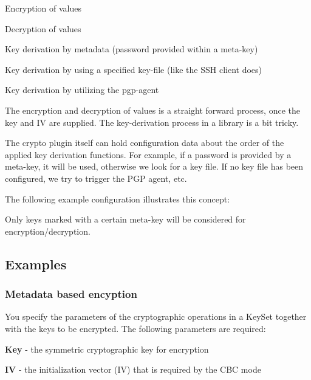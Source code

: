 \begin{DoxyItemize}
\item Encryption of values
\item Decryption of values
\item Key derivation by metadata (password provided within a meta-\/key)
\item Key derivation by using a specified key-\/file (like the S\+S\+H client does)
\item Key derivation by utilizing the pgp-\/agent
\end{DoxyItemize}

The encryption and decryption of values is a straight forward process, once the key and I\+V are supplied. The key-\/derivation process in a library is a bit tricky.

The crypto plugin itself can hold configuration data about the order of the applied key derivation functions. For example, if a password is provided by a meta-\/key, it will be used, otherwise we look for a key file. If no key file has been configured, we try to trigger the P\+G\+P agent, etc.

The following example configuration illustrates this concept\+: 


Only keys marked with a certain meta-\/key will be considered for encryption/decryption.

\subsection*{Examples}

\subsubsection*{Metadata based encyption}

You specify the parameters of the cryptographic operations in a Key\+Set together with the keys to be encrypted. The following parameters are required\+:


\begin{DoxyItemize}
\item {\bfseries Key} -\/ the symmetric cryptographic key for encryption
\item {\bfseries I\+V} -\/ the initialization vector (I\+V) that is required by the C\+B\+C mode
\end{DoxyItemize}

